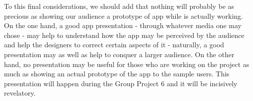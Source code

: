 \documentclass[12pt]{scrartcl}
\begin{document}
	To this final considerations, we should add that nothing will probably be as precious as showing our audience a prototype of app while is actually working. On the one hand, a good app presentation  - through whatever media one may chose - may help to understand how the app may be perceived by the audience and help the designers to correct certain aspects of it - naturally, a good presentation may as well as help to conquer a larger audience. On the other hand, no presentation may be useful for those who are working on the project as much as showing an actual prototype of the app to the sample users. This presentation will happen during the Group Project 6 and it will be incisively revelatory. 
\end{document}
